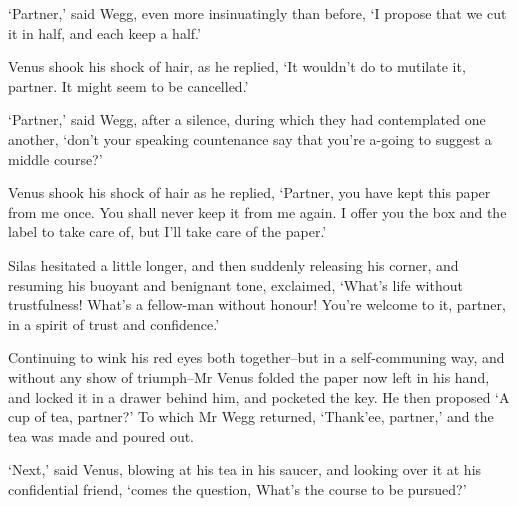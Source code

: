 ‘Partner,’ said Wegg, even more insinuatingly than before, ‘I propose
that we cut it in half, and each keep a half.’

Venus shook his shock of hair, as he replied, ‘It wouldn’t do to
mutilate it, partner. It might seem to be cancelled.’

‘Partner,’ said Wegg, after a silence, during which they had
contemplated one another, ‘don’t your speaking countenance say that
you’re a-going to suggest a middle course?’

Venus shook his shock of hair as he replied, ‘Partner, you have kept
this paper from me once. You shall never keep it from me again. I offer
you the box and the label to take care of, but I’ll take care of the
paper.’

Silas hesitated a little longer, and then suddenly releasing his corner,
and resuming his buoyant and benignant tone, exclaimed, ‘What’s life
without trustfulness! What’s a fellow-man without honour! You’re welcome
to it, partner, in a spirit of trust and confidence.’

Continuing to wink his red eyes both together--but in a self-communing
way, and without any show of triumph--Mr Venus folded the paper now left
in his hand, and locked it in a drawer behind him, and pocketed the key.
He then proposed ‘A cup of tea, partner?’ To which Mr Wegg returned,
‘Thank’ee, partner,’ and the tea was made and poured out.

‘Next,’ said Venus, blowing at his tea in his saucer, and looking over
it at his confidential friend, ‘comes the question, What’s the course to
be pursued?’

